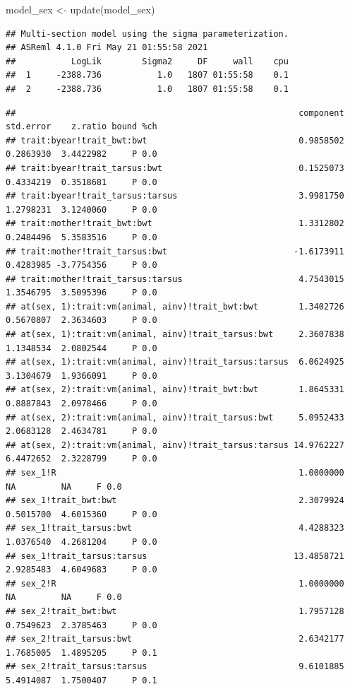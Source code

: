 \documentclass[
  12pt,
]{book}
\newenvironment{Shaded}{\begin{snugshade}}{\end{snugshade}}
\newcommand{\FunctionTok}[1]{\textcolor[rgb]{0.00,0.00,0.00}{#1}}
\newcommand{\NormalTok}[1]{#1}
\newcommand{\OtherTok}[1]{\textcolor[rgb]{0.56,0.35,0.01}{#1}}
\newcommand{\SpecialCharTok}[1]{\textcolor[rgb]{0.00,0.00,0.00}{#1}}
\begin{document}
\begin{Shaded}
\begin{Highlighting}[]
\NormalTok{model\_sex }\OtherTok{\textless{}{-}} \FunctionTok{update}\NormalTok{(model\_sex)}
\end{Highlighting}
\end{Shaded}

\begin{verbatim}
## Multi-section model using the sigma parameterization.
## ASReml 4.1.0 Fri May 21 01:55:58 2021
##           LogLik        Sigma2     DF     wall    cpu
##  1     -2388.736           1.0   1807 01:55:58    0.1
##  2     -2388.736           1.0   1807 01:55:58    0.1
\end{verbatim}

\begin{Shaded}
\end{Shaded}

\begin{verbatim}
##                                                        component std.error    z.ratio bound %ch
## trait:byear!trait_bwt:bwt                              0.9858502 0.2863930  3.4422982     P 0.0
## trait:byear!trait_tarsus:bwt                           0.1525073 0.4334219  0.3518681     P 0.0
## trait:byear!trait_tarsus:tarsus                        3.9981750 1.2798231  3.1240060     P 0.0
## trait:mother!trait_bwt:bwt                             1.3312802 0.2484496  5.3583516     P 0.0
## trait:mother!trait_tarsus:bwt                         -1.6173911 0.4283985 -3.7754356     P 0.0
## trait:mother!trait_tarsus:tarsus                       4.7543015 1.3546795  3.5095396     P 0.0
## at(sex, 1):trait:vm(animal, ainv)!trait_bwt:bwt        1.3402726 0.5670807  2.3634603     P 0.0
## at(sex, 1):trait:vm(animal, ainv)!trait_tarsus:bwt     2.3607838 1.1348534  2.0802544     P 0.0
## at(sex, 1):trait:vm(animal, ainv)!trait_tarsus:tarsus  6.0624925 3.1304679  1.9366091     P 0.0
## at(sex, 2):trait:vm(animal, ainv)!trait_bwt:bwt        1.8645331 0.8887843  2.0978466     P 0.0
## at(sex, 2):trait:vm(animal, ainv)!trait_tarsus:bwt     5.0952433 2.0683128  2.4634781     P 0.0
## at(sex, 2):trait:vm(animal, ainv)!trait_tarsus:tarsus 14.9762227 6.4472652  2.3228799     P 0.0
## sex_1!R                                                1.0000000        NA         NA     F 0.0
## sex_1!trait_bwt:bwt                                    2.3079924 0.5015700  4.6015360     P 0.0
## sex_1!trait_tarsus:bwt                                 4.4288323 1.0376540  4.2681204     P 0.0
## sex_1!trait_tarsus:tarsus                             13.4858721 2.9285483  4.6049683     P 0.0
## sex_2!R                                                1.0000000        NA         NA     F 0.0
## sex_2!trait_bwt:bwt                                    1.7957128 0.7549623  2.3785463     P 0.0
## sex_2!trait_tarsus:bwt                                 2.6342177 1.7685005  1.4895205     P 0.1
## sex_2!trait_tarsus:tarsus                              9.6101885 5.4914087  1.7500407     P 0.1
\end{verbatim}
\end{document}
